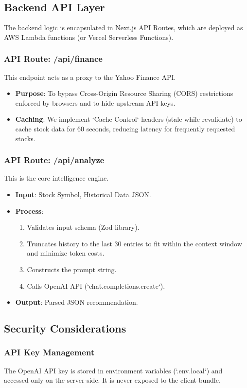 \subsection{Backend API Layer}
The backend logic is encapsulated in Next.js API Routes, which are deployed as AWS Lambda functions (or Vercel Serverless Functions).
\subsubsection{API Route: /api/finance}
This endpoint acts as a proxy to the Yahoo Finance API.
\begin{itemize}
    \item \textbf{Purpose}: To bypass Cross-Origin Resource Sharing (CORS) restrictions enforced by browsers and to hide upstream API keys.
    \item \textbf{Caching}: We implement `Cache-Control` headers (stale-while-revalidate) to cache stock data for 60 seconds, reducing latency for frequently requested stocks.
\end{itemize}

\subsubsection{API Route: /api/analyze}
This is the core intelligence engine.
\begin{itemize}
    \item \textbf{Input}: Stock Symbol, Historical Data JSON.
    \item \textbf{Process}:
        \begin{enumerate}
            \item Validates input schema (Zod library).
            \item Truncates history to the last 30 entries to fit within the context window and minimize token costs.
            \item Constructs the prompt string.
            \item Calls OpenAI API (`chat.completions.create`).
        \end{enumerate}
    \item \textbf{Output}: Parsed JSON recommendation.
\end{itemize}

\subsection{Security Considerations}
\subsubsection{API Key Management}
The OpenAI API key is stored in environment variables (`.env.local`) and accessed only on the server-side. It is never exposed to the client bundle.
